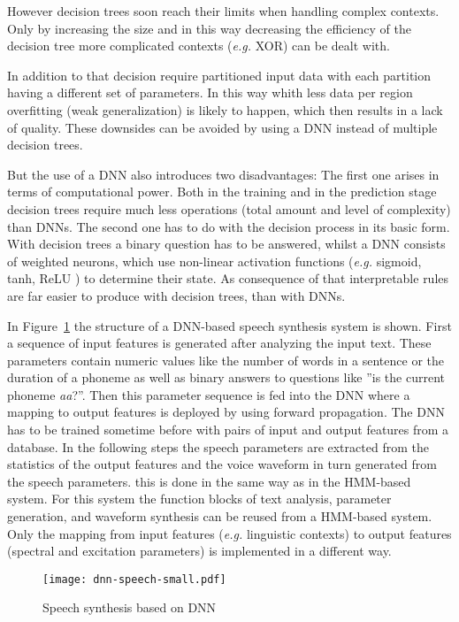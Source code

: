 However decision trees soon reach their limits when handling complex contexts. Only by increasing the size and in this way decreasing the efficiency of the decision tree more complicated contexts (\textit{e.g.} XOR) can be dealt with. 

In addition to that decision require partitioned input data with each partition having a different set of parameters. In this way whith less data per region overfitting (weak generalization) is likely to happen, which then results in a lack of quality. These downsides can be avoided by using a \ac{DNN} instead of multiple decision trees.

But the use of a \ac{DNN} also introduces two disadvantages: The first one arises in terms of computational power. Both in the training and in the prediction stage decision trees require much less operations (total amount and level of complexity) than \acp{DNN}. The second one has to do with the decision process in its basic form. With decision trees a binary question has to be answered, whilst a \ac{DNN} consists of weighted neurons, which use non-linear activation functions (\textit{e.g.} sigmoid, tanh, ReLU \cite{chung:activation}) to determine their state. As consequence of that interpretable rules are far easier to produce with decision trees, than with \acp{DNN}.

In Figure~\ref{fig:dnnspeech} the structure of a \ac{DNN}-based speech synthesis system is shown. First a sequence of input features is generated after analyzing the input text. These parameters contain numeric values like the number of words in a sentence or the duration of a phoneme as well as binary answers to questions like ''is the current phoneme \textit{aa}?''. Then this parameter sequence is fed into the \ac{DNN} where a mapping to output features is deployed by using forward propagation. The \ac{DNN} has to be trained sometime before with pairs of input and output features from a database. In the following steps the speech parameters are extracted from the statistics of the output features and the voice waveform in turn generated from the speech parameters. this is done in the same way as in the \ac{HMM}-based system. For this system the function blocks of text analysis, parameter generation, and waveform synthesis can be reused from a \ac{HMM}-based system. Only the mapping from input features (\textit{e.g.} linguistic contexts) to output features (spectral and excitation parameters) is implemented in a different way.

\begin{figure}[h]
	\texttt{[image: dnn-speech-small.pdf]}
	\caption{Speech synthesis based on \ac{DNN} \cite{zen:deepstatistical}}
	\label{fig:dnnspeech}
\end{figure}

